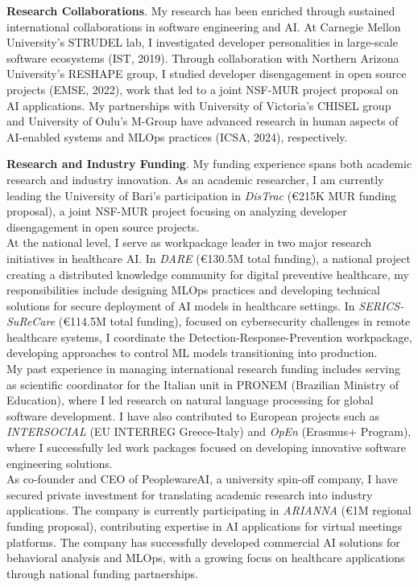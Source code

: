 \textbf{Research Collaborations}.
My research has been enriched through sustained international collaborations in software engineering and AI.
At Carnegie Mellon University's STRUDEL lab, I investigated developer personalities in large-scale software ecosystems (IST, 2019). 
Through collaboration with Northern Arizona University's RESHAPE group, I studied developer disengagement in open source projects (EMSE, 2022), work that led to a joint NSF-MUR project proposal on AI applications.
My partnerships with University of Victoria's CHISEL group and University of Oulu's M-Group have advanced research in human aspects of AI-enabled systems and MLOps practices (ICSA, 2024), respectively.

\textbf{Research and Industry Funding}.
My funding experience spans both academic research and industry innovation. As an academic researcher, I am currently leading the University of Bari's participation in \textit{DisTrac} (€215K MUR funding proposal), a joint NSF-MUR project focusing on analyzing developer disengagement in open source projects.\\
At the national level, I serve as workpackage leader in two major research initiatives in healthcare AI. In \textit{DARE} (€130.5M total funding), a national project creating a distributed knowledge community for digital preventive healthcare, my responsibilities include designing MLOps practices and developing technical solutions for secure deployment of AI models in healthcare settings. In \textit{SERICS-SuReCare} (€114.5M total funding), focused on cybersecurity challenges in remote healthcare systems, I coordinate the Detection-Response-Prevention workpackage, developing approaches to control ML models transitioning into production.\\
My past experience in managing international research funding includes serving as scientific coordinator for the Italian unit in PRONEM (Brazilian Ministry of Education), where I led research on natural language processing for global software development. I have also contributed to European projects such as \textit{INTERSOCIAL} (EU INTERREG Greece-Italy) and \textit{OpEn} (Erasmus+ Program), where I successfully led work packages focused on developing innovative software engineering solutions.\\
As co-founder and CEO of PeoplewareAI, a university spin-off company, I have secured private investment for translating academic research into industry applications. The company is currently participating in \textit{ARIANNA} (€1M regional funding proposal), contributing expertise in AI applications for virtual meetings platforms. The company has successfully developed commercial AI solutions for behavioral analysis and MLOps, with a growing focus on healthcare applications through national funding partnerships.

